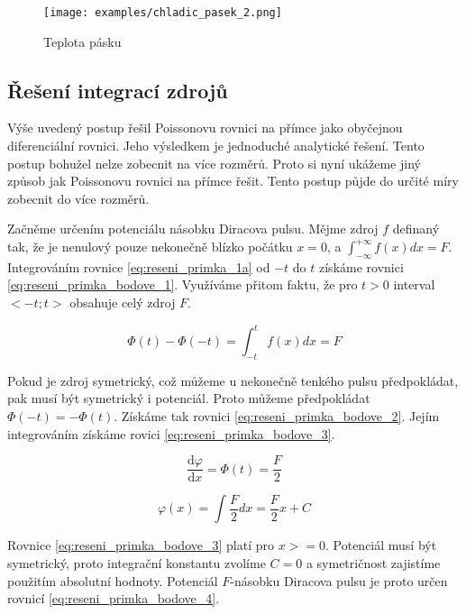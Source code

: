 \documentclass{book}
\begin{document}
\begin{figure}
	\texttt{[image: examples/chladic\_pasek\_2.png]}
	\caption{Teplota pásku}
	\label{img:pasek_teplota}
\end{figure}

\subsection{Řešení integrací zdrojů}

Výše uvedený postup řešil Poissonovu rovnici na přímce jako obyčejnou diferenciální rovnici. Jeho výsledkem je jednoduché analytické řešení. Tento postup bohužel nelze zobecnit na více rozměrů. Proto si nyní ukážeme 
jiný způsob jak Poissonovu rovnici na přímce řešit. Tento postup půjde do určité míry zobecnit do více rozměrů.

Začněme určením potenciálu násobku Diracova pulsu. Mějme zdroj \(f\) definaný tak, že je nenulový pouze nekonečně blízko počátku \(x = 0\), a \(\int_{-\infty}^{+\infty} f(x) dx = F\). Integrováním rovnice
\eqref{eq:reseni_primka_1a} od \(-t\) do \(t\) získáme rovnici \eqref{eq:reseni_primka_bodove_1}. Využíváme přitom faktu, že pro \(t > 0\) interval \(<-t; t>\) obsahuje celý zdroj \(F\).

\begin{equation}
\label{eq:reseni_primka_bodove_1}
\Phi(t) - \Phi(-t) = \int_{-t}^{t} f(x) dx = F
\end{equation}

Pokud je zdroj symetrický, což můžeme u nekonečně tenkého pulsu předpokládat, pak musí být symetrický i potenciál. Proto můžeme předpokládat \(\Phi(-t) = -\Phi(t)\). Získáme tak rovnici
\eqref{eq:reseni_primka_bodove_2}. Jejím integrováním získáme rovici \eqref{eq:reseni_primka_bodove_3}.

\begin{equation}
\label{eq:reseni_primka_bodove_2}
\frac{\mathrm{d} \varphi}{\mathrm{d} x} = \Phi(t) = \frac{F}{2}
\end{equation}

\begin{equation}
\label{eq:reseni_primka_bodove_3}
\varphi(x) = \int \frac{F}{2} dx = \frac{F}{2} x + C
\end{equation}

Rovnice \eqref{eq:reseni_primka_bodove_3} platí pro \(x >= 0\). Potenciál musí být symetrický, proto integrační konstantu zvolíme \(C = 0\) a symetričnost zajistíme použitím absolutní hodnoty. Potenciál
\(F\)-násobku Diracova pulsu je proto určen rovnicí \eqref{eq:reseni_primka_bodove_4}.
\end{document}
